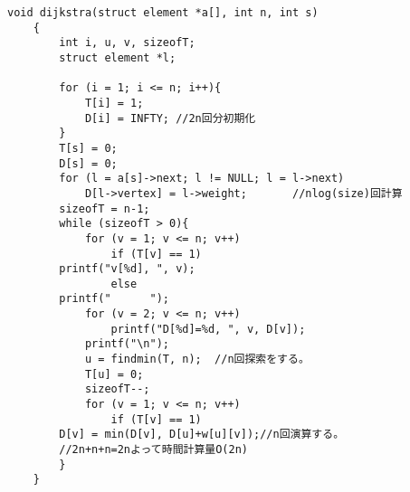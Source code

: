 \documentclass[a4paper,titlepage,11pt]{ltjsarticle}
\begin{document}
\begin{lstlisting}[caption=enshukadai9]
	void dijkstra(struct element *a[], int n, int s)
	{
		int i, u, v, sizeofT;
		struct element *l;
	
		for (i = 1; i <= n; i++){
			T[i] = 1;
			D[i] = INFTY; //2n回分初期化
		}
		T[s] = 0;
		D[s] = 0;
		for (l = a[s]->next; l != NULL; l = l->next)
			D[l->vertex] = l->weight;		//nlog(size)回計算
		sizeofT = n-1;
		while (sizeofT > 0){
			for (v = 1; v <= n; v++) 
				if (T[v] == 1)
		printf("v[%d], ", v);
				else
		printf("      ");
			for (v = 2; v <= n; v++) 
				printf("D[%d]=%d, ", v, D[v]);
			printf("\n");
			u = findmin(T, n);  //n回探索をする。
			T[u] = 0;          
			sizeofT--;
			for (v = 1; v <= n; v++)
				if (T[v] == 1)
		D[v] = min(D[v], D[u]+w[u][v]);//n回演算する。
		//2n+n+n=2nよって時間計算量O(2n)
		}
	}
\end{lstlisting}
\end{document}
